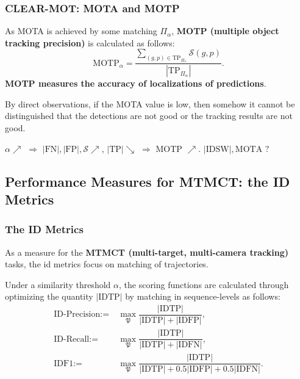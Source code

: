 \documentclass[slidetop, mathserif]{beamer}
\begin{document}
\begin{frame}
	\frametitle{CLEAR-MOT: MOTA and MOTP}
	
	As MOTA is achieved by some matching $\Pi_\alpha$, {\bf MOTP (multiple object tracking precision)}
	is calculated as follows:
	\[
		\text{MOTP}_\alpha =
		\dfrac{\sum_{(g,p)\in\text{TP}_{\Pi_\alpha}}\mathcal S(g,p)}{|\text{TP}_{\Pi_\alpha}|}.
	\]
	{\bf\color{red} MOTP measures the accuracy of localizations of predictions}.
	
	\vspace{4pt}
	
	By direct observations, if the MOTA value is low,
	then somehow it cannot be distinguished that
	the detections are not good or the tracking results are not good.
	
	\vspace{5pt}

	$\alpha\nearrow$ $\Rightarrow$ $|\text{FN}|, |\text{FP}|, \mathcal S \nearrow$, $|\text{TP}| \searrow$ $\Rightarrow$ MOTP $\nearrow$.
	$|\text{IDSW}|, \text{MOTA}$ $?$

	
	
\end{frame}

\subsection{Performance Measures for MTMCT: the ID Metrics}

\begin{frame}
	\frametitle{The ID Metrics}
	
	As a measure for the {\bf MTMCT (multi-target, multi-camera tracking)} tasks,
	the id metrics focus on matching of trajectories.
	
	\quad 
	
	Under a similarity threshold $\alpha$, the scoring functions are calculated through optimizing
	the quantity $|\text{IDTP}|$ by matching in sequence-levels as follows:
	\begin{align*}
		\text{ID-Precision} := & ~ \max_{\mathfrak P} \dfrac{|\text{IDTP}|}{|\text{IDTP}| + |\text{IDFP}|}, \\
		\text{ID-Recall} :=    & ~ \max_{\mathfrak P}\dfrac{|\text{IDTP}|}{|\text{IDTP}| + |\text{IDFN}|},  \\
		\text{IDF1} :=         &                                                                            
		~ \max_{\mathfrak P}\dfrac{|\text{IDTP}|}{|\text{IDTP}| + 0.5|\text{IDFP}| + 0.5|\text{IDFN}|}.
	\end{align*}
	
\end{frame}
\end{document}
